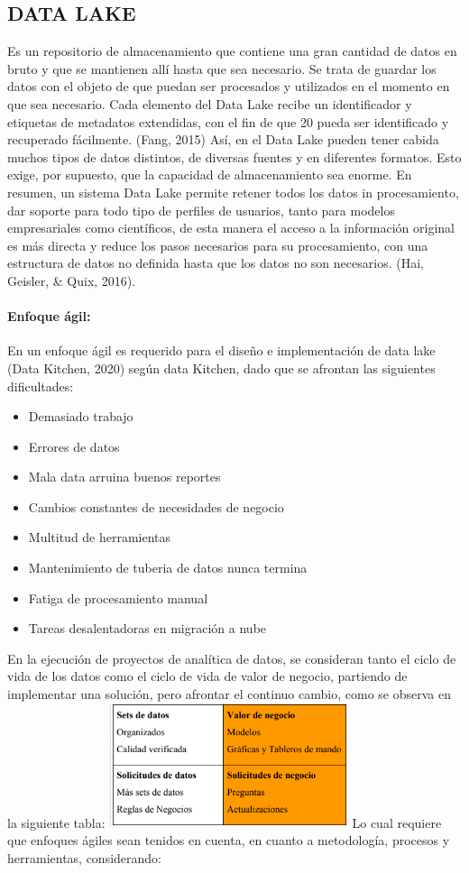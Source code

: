 \documentclass[twoside,twocolumn]{article}
\begin{document}
\subsection{DATA LAKE}
Es un repositorio de almacenamiento que contiene una gran cantidad de datos en bruto y que se mantienen allí hasta que sea necesario. Se trata de guardar los datos con el objeto de que puedan ser procesados y utilizados en el momento en que sea necesario. Cada elemento del Data Lake recibe un identificador y etiquetas de metadatos extendidas, con el fin de que 20 pueda ser identificado y recuperado fácilmente. (Fang, 2015) Así, en el Data Lake pueden tener cabida muchos tipos de datos distintos, de diversas fuentes y en diferentes formatos. Esto exige, por supuesto, que la capacidad de almacenamiento sea enorme. En resumen, un sistema Data Lake permite retener todos los datos in procesamiento, dar soporte para todo tipo de perfiles de usuarios, tanto para modelos empresariales como científicos, de esta manera el acceso a la información original es más directa y reduce los pasos necesarios para su procesamiento, con una estructura de datos no definida hasta que los datos no son necesarios. (Hai, Geisler, & Quix, 2016). 

\paragraph{Enfoque ágil:}
En un enfoque ágil es requerido para el diseño e implementación de data lake (Data Kitchen, 
2020) según data Kitchen, dado que se afrontan las siguientes dificultades: 

\begin{itemize}
    \item Demasiado trabajo
    \item Errores de datos
    \item Mala data arruina buenos reportes
    \item Cambios constantes de necesidades de negocio 
    \item Multitud de herramientas
    \item Mantenimiento de tuberia de datos nunca termina
    \item Fatiga de procesamiento manual
    \item Tareas desalentadoras en migración a nube
\end{itemize}

En la ejecución de proyectos de analítica de datos, se consideran tanto el ciclo de vida de los 
datos como el ciclo de vida de valor de negocio, partiendo de implementar una solución, pero 
afrontar el continuo cambio, como se observa en la siguiente tabla:
\includegraphics[width=7cm]{imagenes/img5.png}
Lo cual requiere que enfoques ágiles sean tenidos en cuenta, en cuanto a metodología, 
procesos y herramientas, considerando: 
\end{document}
